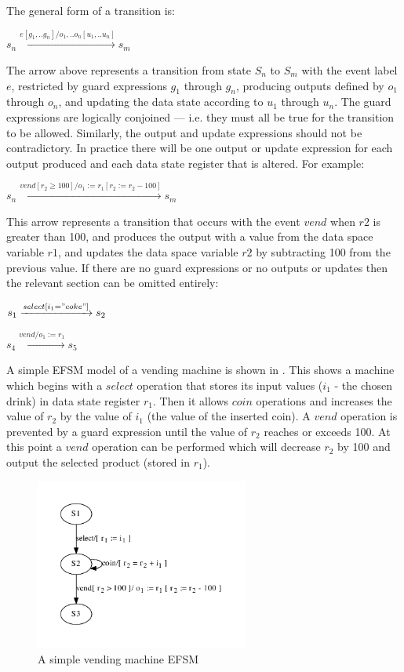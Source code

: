 The general form of a transition is: 

\begin{center}
$s_n \xrightarrow{e[g_1, .. g_n]/o_1, .. o_n[u_1, .. u_n]} s_m$ 
\end{center}

The arrow above represents a transition from state $S_n$ to $S_m$ with the event label $e$, restricted by guard expressions $g_1$ through $g_n$, producing outputs defined by $o_1$ through $o_n$, and updating the data state according to $u_1$ through $u_n$. The guard expressions are logically conjoined --- i.e. they must all be true for the transition to be allowed. Similarly, the output and update expressions should not be contradictory. In practice there will be one output or update expression for each output produced and each data state register that is altered. For example:

\begin{center}
$s_n \xrightarrow{vend[r_{2} \geq 100]/o_{1} :=r_{1}[r_{2} := r_{2} - 100]} s_m$
\end{center}

This arrow represents a transition that occurs with the event $vend$ when $r2$ is greater than 100, and produces the output with a value from the data space variable $r1$, and updates the data space variable $r2$ by subtracting 100 from the previous value. If there are no guard expressions or no outputs or updates then the relevant section can be omitted entirely:

\begin{center}
$s_1 \xrightarrow{select[i_{1}="coke"]} s_2$

$s_4 \xrightarrow{vend/o_{1} := r_{1}} s_5$
\end{center}

A simple EFSM model of a vending machine is shown in . This shows a machine which begins with a $select$ operation that stores its input values ($i_1$ - the chosen drink) in data state register $r_1$. Then it allows $coin$ operations and increases the value of $r_2$ by the value of $i_1$ (the value of the inserted coin). A $vend$ operation is prevented by a guard expression until the value of $r_2$ reaches or exceeds 100. At this point a $vend$ operation can be performed which will decrease $r_2$ by 100 and output the selected product (stored in $r_1$).

\begin{figure}[here]
\begin{center}
\includegraphics[width=7cm]{vend-real.pdf}
\caption{A simple vending machine EFSM}
\label{fig:vendsimple}
\end{center}
\end{figure}

